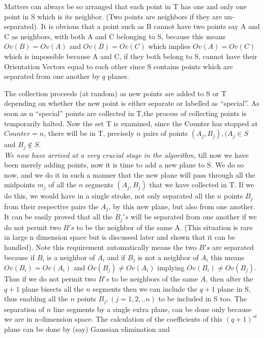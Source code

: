\documentclass[english]{article}
\begin{document}
Matters can always be so arranged that each point in T has one and
only one point in S which is its neighbor. (Two points are neighbors
if they are un-separated). It is obvious that a point such as B cannot
have two points say A and C as neighbors, with both A and C belonging to S,
 because this means $Ov(B)=Ov(A)$ and $Ov(B)=Ov(C)$ which implies $Ov(A)=Ov(C)$
which is impossible because A and C, if they both belong to S, cannot
have their Orientation Vectors equal to each other since S contains
points which are separated from one another by $q$ planes.

 The collection proceeds (at random) as new points are added to S or T depending on
whether the new point is either separate or labelled as {}``special''.
As soon as n {}``special'' points are collected in T,the process
of collecting points is temporarily halted. Now the set T is examined,
since the Counter has stopped at $Counter=n$, there will be in T,
precisely $n$ pairs of points $(A_{j},B_{j}),(A_{j}\in S$ and $B_{j}\notin S$.
\\
\emph{We now have arrived at a very crucial stage in the algorithm},
till now we have been merely adding points, now it is time to add
a new plane to S. We do so now, and we do it in such a manner that
the new plane will pass through all the midpoints $m_{j}$ of all
the $n$ segments $(A_{j},B_{j})$ that we have collected in T. If
we do this, we would have in a single stroke, not only separated all
the $n$ points $B_{j}$ from their respective \textquotedbl{}pairs\textquotedbl{}
the $A_{j}$, by this new plane, but also from one another. It can
be easily proved that all the $B_{j}'s$ will be separated from one
another if we do not permit two $B's$ to be the neighbor of the same
A. (This situation is rare in large n dimension space but is discussed later 
and shown that it can be handled). Note this requirement automatically means the
two $B's$ are separated because if $B_{i}$ is a neighbor of $A_{i}$
and if $B_{j}$ is not a neighbor of $A_{i}$ this means $Ov(B_{i})=Ov(A_{i})$
and $Ov(B_{j})\ne Ov(A_{i})$ implying $Ov(B_{i})\ne Ov(B_{j})$.
Thus if we do not permit two $B's$ to be neighbors of the same $A$,
then after the $q+1$ plane bisects all the $n$ segments then we
can include the $q+1$ plane in S, thus enabling all the $n$ points
$B_{j},(j=1,2,..n)$ to be included in S too. The separation of $n$
line segments by a single extra plane, can be done only because we
are in n-dimension space. The calculation of the coefficients of this
$(q+1)^{st}$ plane can be done by (say) Gaussian elimination and
\end{document}
